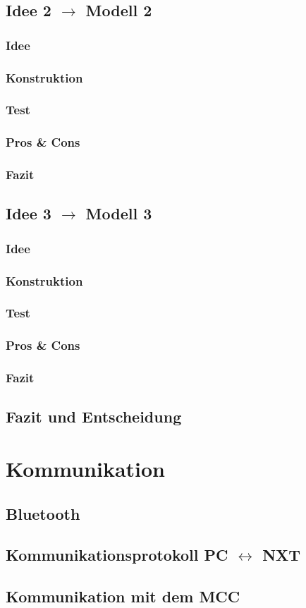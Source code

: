 \documentclass[10pt,a4paper]{scrartcl}
\begin{document}
\subsection{Idee 2 $\rightarrow$ Modell 2}%
\subsubsection{Idee}
\subsubsection{Konstruktion}
\subsubsection{Test}
\subsubsection{Pros \& Cons}
\subsubsection{Fazit}
\subsection{Idee 3 $\rightarrow$ Modell 3}%
\subsubsection{Idee}
\subsubsection{Konstruktion}
\subsubsection{Test}
\subsubsection{Pros \& Cons}
\subsubsection{Fazit}
\subsection{Fazit und Entscheidung}
\section{Kommunikation}
\subsection{Bluetooth}
\subsection{Kommunikationsprotokoll PC $\leftrightarrow$ NXT}
\subsection{Kommunikation mit dem MCC}
\end{document}
